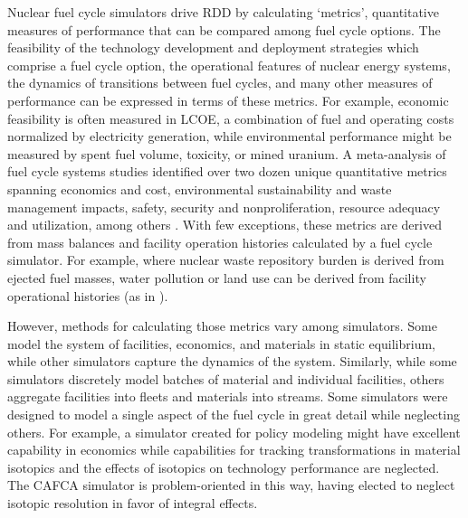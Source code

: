 

Nuclear fuel cycle simulators drive \gls{RDD} by calculating `metrics',
quantitative measures of performance that can be compared among fuel cycle
options.  The feasibility of the technology development and deployment
strategies which comprise a fuel cycle option, the operational features of
nuclear energy systems, the dynamics of transitions between fuel cycles, and
many other measures of performance can be expressed in terms of these metrics.
For example, economic feasibility is often measured in \gls{LCOE}, a
combination of fuel and operating costs normalized by electricity generation, while
environmental performance might be measured by spent fuel volume, toxicity, or
mined uranium.  A meta-analysis of fuel cycle systems studies identified over
two dozen unique quantitative metrics spanning economics and cost,
environmental sustainability and waste management impacts, safety, security and
nonproliferation, resource adequacy and utilization, among others
\cite{flicker_evaluation_2014}. With few exceptions, these metrics are derived from
mass balances and facility operation histories calculated by a fuel cycle
simulator. For example, where nuclear waste repository burden is derived from
ejected fuel masses, water pollution or land use can be derived from facility
operational histories (as in \cite{poinssot_assessment_2014}).

However, methods for calculating those metrics vary among simulators. Some
model the system of facilities, economics, and materials in static equilibrium,
while other simulators capture the dynamics of the system.  Similarly, while
some simulators discretely model batches of material and individual facilities,
others aggregate facilities into fleets and materials into streams. Some
simulators were designed to model a single aspect of the fuel cycle in great
detail while neglecting others. For example, a simulator created for policy
modeling might have excellent capability in economics while capabilities for
tracking transformations in material isotopics and the effects of isotopics on
technology performance are neglected.  The \gls{CAFCA}\cite{guerin_impact_2009}
simulator is problem-oriented in this way, having elected to neglect isotopic
resolution in favor of integral effects.

